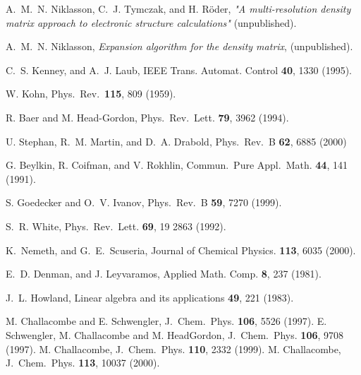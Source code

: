 \commentoutA{\documentclass[prb,aps,twocolumn,twocolumngrid,secnumarabic,superbib,hyperref]{revtex4}}
\begin{document}
\begin{references}
 A.\ M.\ N. Niklasson, C.\ J. Tymczak, and H. R\"oder,
{\it "A multi-resolution density matrix approach to electronic structure
calculations"} (unpublished).

 A.\ M.\ N. Niklasson, {\it Expansion
algorithm for the density matrix}, (unpublished).

 C.\ S. Kenney, and A.\ J. Laub,
IEEE Trans. Automat. Control {\bf 40}, 1330 (1995).

 W. Kohn,
Phys.\ Rev.\ {\bf 115}, 809 (1959).

 R. Baer and M. Head-Gordon,
Phys.\ Rev.\ Lett. {\bf 79}, 3962 (1994).

 U. Stephan, R.\ M. Martin, and D.\ A. Drabold,
Phys.\ Rev.\ B {\bf 62}, 6885 (2000)

 G. Beylkin, R. Coifman, and V. Rokhlin,
Commun.\ Pure Appl.\ Math. {\bf 44}, 141 (1991).

 S. Goedecker and O.\ V. Ivanov,
Phys.\ Rev.\ B {\bf 59}, 7270 (1999).

 S.\ R. White,
Phys.\ Rev.\ Lett. {\bf 69}, 19 2863 (1992).

 K.\ Nemeth, and G.\ E.\ Scuseria,
Journal of Chemical Physics. {\bf 113}, 6035 (2000).

 E.\ D. Denman, and J. Leyvaramos,
Applied Math. Comp. {\bf 8}, 237 (1981).

 J.\ L. Howland,
Linear algebra and its applications {\bf 49}, 221 (1983).~

 M. Challacombe and E. Schwengler,
J.\ Chem.\ Phys. {\bf 106}, 5526 (1997).
E. Schwengler, M. Challacombe and M. HeadGordon,
J.\ Chem.\ Phys. {\bf 106}, 9708 (1997).
M. Challacombe, J.\ Chem.\ Phys. {\bf 110}, 2332 (1999).
M.  Challacombe, J.\ Chem.\ Phys. {\bf 113}, 10037 (2000).


\end{references}

\begin{figure}
\caption{\small
\label{Conv}}
\end{figure}



\begin{figure}
\caption{\small
\label{ConvN}}
\end{figure}

\begin{figure}
\caption{\small
\label{Lin}}
\end{figure}
\end{document}
